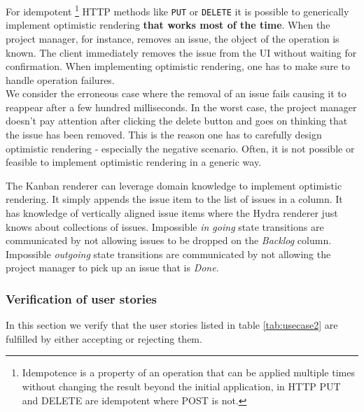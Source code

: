 For idempotent \footnote{Idempotence is a property of an operation that can be applied multiple times without changing the result beyond the initial application, in HTTP PUT and DELETE are idempotent where POST is not.} HTTP methods like \lstinline{PUT} or \lstinline{DELETE} it is possible to generically implement optimistic rendering \textbf{that works most of the time}. When the project manager, for instance, removes an issue, the object of the operation is known. The client immediately removes the issue from the UI without waiting for confirmation. When implementing optimistic rendering, one has to make sure to handle operation failures. \\
We consider the erroneous case where the removal of an issue fails causing it to reappear after a few hundred milliseconds. In the worst case, the project manager doesn't pay attention after clicking the delete button and goes on thinking that the issue has been removed. This is the reason one has to carefully design optimistic rendering - especially the negative scenario. Often, it is not possible or feasible to implement optimistic rendering in a generic way.

The Kanban renderer can leverage domain knowledge to implement optimistic rendering. It simply appends the issue item to the list of issues in a column. It has knowledge of vertically aligned issue items where the Hydra renderer just knows about collections of issues. Impossible \textit{in going} state transitions are communicated by not allowing issues to be dropped on the \textit{Backlog} column. Impossible \textit{outgoing} state transitions are communicated by not allowing the project manager to pick up an issue that is \textit{Done}.

\subsubsection{Verification of user stories}
In this section we verify that the user stories listed in table \ref{tab:usecase2} are fulfilled by either accepting or rejecting them.

